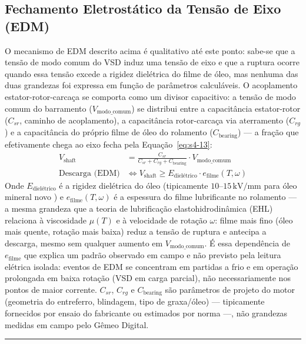 \documentclass[12pt,a4paper]{article}
\numberwithin{equation}{section}
\numberwithin{table}{section}
\numberwithin{figure}{section}
\begin{document}
	\subsection{\textbf{Fechamento Eletrostático da Tensão de Eixo (EDM)}}
	O mecanismo de EDM descrito acima é qualitativo até este ponto: sabe-se que a tensão de modo comum do VSD induz uma tensão de eixo e que a ruptura ocorre quando essa tensão excede a rigidez dielétrica do filme de óleo, mas nenhuma das duas grandezas foi expressa em função de parâmetros calculáveis. O acoplamento estator-rotor-carcaça se comporta como um divisor capacitivo: a tensão de modo comum do barramento ($V_{\text{modo\_comum}}$) se distribui entre a capacitância estator-rotor ($C_{sr}$, caminho de acoplamento), a capacitância rotor-carcaça via aterramento ($C_{rg}$) e a capacitância do próprio filme de óleo do rolamento ($C_{\text{bearing}}$) — a fração que efetivamente chega ao eixo fecha pela Equação~\eqref{eq:s4-13}:
	\begin{equation}\label{eq:s4-13}
	\begin{aligned}
		V_{\text{shaft}} &= \frac{C_{sr}}{C_{sr} + C_{rg} + C_{\text{bearing}}} \cdot V_{\text{modo\_comum}} \\[4pt]
		\text{Descarga (EDM)} &\iff V_{\text{shaft}} \geq E_{\text{dielétrico}} \cdot e_{\text{filme}}(T, \omega)
	\end{aligned}
\end{equation}
	Onde $E_{\text{dielétrico}}$ é a rigidez dielétrica do óleo (tipicamente $10$--$15\,\text{kV/mm}$ para óleo mineral novo \cite{erdman}) e $e_{\text{filme}}(T, \omega)$ é a espessura do filme lubrificante no rolamento — a mesma grandeza que a teoria de lubrificação elastohidrodinâmica (EHL) relaciona à viscosidade $\mu(T)$ e à velocidade de rotação $\omega$: filme mais fino (óleo mais quente, rotação mais baixa) reduz a tensão de ruptura e antecipa a descarga, mesmo sem qualquer aumento em $V_{\text{modo\_comum}}$. É essa dependência de $e_{\text{filme}}$ que explica um padrão observado em campo e não previsto pela leitura elétrica isolada: eventos de EDM se concentram em partidas a frio e em operação prolongada em baixa rotação (VSD em carga parcial), não necessariamente nos pontos de maior corrente. $C_{sr}$, $C_{rg}$ e $C_{\text{bearing}}$ são parâmetros de projeto do motor (geometria do entreferro, blindagem, tipo de graxa/óleo) — tipicamente fornecidos por ensaio do fabricante ou estimados por norma \cite{erdman} —, não grandezas medidas em campo pelo Gêmeo Digital.

	\vspace{1em}
	\hrule
	\vspace{1em}
\end{document}
